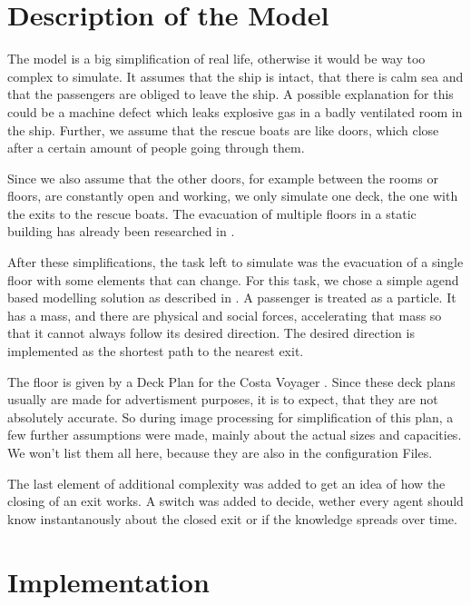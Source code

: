 \documentclass[11pt]{article}
\begin{document}
\section{Description of the Model}

The model is a big simplification of real life, otherwise it would be way too
complex to simulate.  It assumes that the ship is intact, that there is calm
sea and that the passengers are obliged to leave the ship.  A possible
explanation for this could be a machine defect which leaks explosive gas in a
badly ventilated room in the ship.  Further, we assume that the rescue boats are
like doors, which close after a certain amount of people going through them. 

Since we also assume that the other doors, for example between the rooms or
floors, are constantly open and working, we only simulate one deck, the one
with the exits to the rescue boats.  The evacuation of multiple floors in a
static building has already been researched in \cite{multilevel}. 

After these simplifications, the task left to simulate was the evacuation of a
single floor with some elements that can change.  For this task, we chose a
simple agend based modelling solution as described in \cite{helbing}.  A
passenger is treated as a particle.  It has a mass, and there are physical and
social forces, accelerating that mass so that it cannot always follow its
desired direction.  The desired direction is implemented as the shortest path
to the nearest exit.

The floor is given by a Deck Plan for the Costa Voyager \cite{costa}. Since these deck plans usually are made for advertisment purposes, it is to expect, that they are not absolutely accurate.
So during image processing for simplification of this plan, a few further assumptions were made, mainly about the actual sizes and capacities. 
We won't list them all here, because they are also in the configuration Files. 

The last element of additional complexity was added to get an idea of how the closing of an exit works. 
A switch was added to decide, wether every agent should know instantanously about the closed exit or if the knowledge spreads over time.

\section{Implementation}
\end{document}
